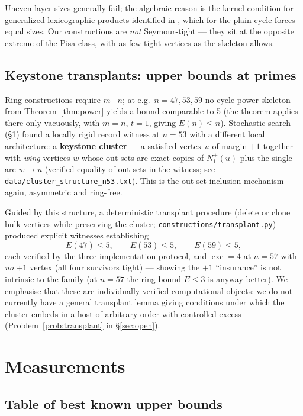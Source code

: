 \documentclass[11pt]{amsart}
\theoremstyle{remark}
\newcommand{\exc}{\operatorname{exc}}
\begin{document}
Uneven layer sizes generally fail; the algebraic reason is the kernel
condition for generalized lexicographic products identified in
\cite[Thm 4.6]{GuoKangZwaneveld2026}, which for the plain cycle forces equal
sizes. Our constructions are \emph{not} Seymour-tight --- they sit at the
opposite extreme of the Pisa class, with as few tight vertices as the
skeleton allows.

\subsection{Keystone transplants: upper bounds at primes}\label{sec:keystone}

Ring constructions require $m \mid n$; at e.g.\ $n = 47, 53, 59$ no
cycle-power skeleton from Theorem~\ref{thm:power} yields a bound comparable
to 5 (the theorem applies there only vacuously, with $m = n$, $t = 1$,
giving $E(n) \le n$). Stochastic search (\S\ref{sec:measurements}) found a locally rigid
record witness at $n = 53$ with a different local architecture: a
\textbf{keystone cluster} --- a satisfied vertex $u$ of margin $+1$ together
with \emph{wing} vertices $w$ whose out-sets are exact copies of $N_1^+(u)$
plus the single arc $w \to u$ (verified equality of out-sets in the witness;
see \texttt{data/cluster\_structure\_n53.txt}). This is the out-set
inclusion mechanism again, asymmetric and ring-free.

Guided by this structure, a deterministic transplant procedure (delete or
clone bulk vertices while preserving the cluster;
\texttt{constructions/transplant.py}) produced explicit witnesses
establishing
\[
E(47) \le 5, \qquad E(53) \le 5, \qquad E(59) \le 5,
\]
each verified by the three-implementation protocol, and $\exc = 4$ at
$n = 57$ with \emph{no} $+1$ vertex (all four survivors tight) --- showing
the $+1$ ``insurance'' is not intrinsic to the family (at $n=57$ the ring
bound $E \le 3$ is anyway better). We emphasise that these are individually
verified computational objects: we do not currently have a general
transplant lemma giving conditions under which the cluster embeds in a host
of arbitrary order with controlled excess
(Problem~\ref{prob:transplant} in \S\ref{sec:open}).

\section{Measurements}\label{sec:measurements}

\subsection{Table of best known upper bounds}\label{sec:table}
\end{document}
